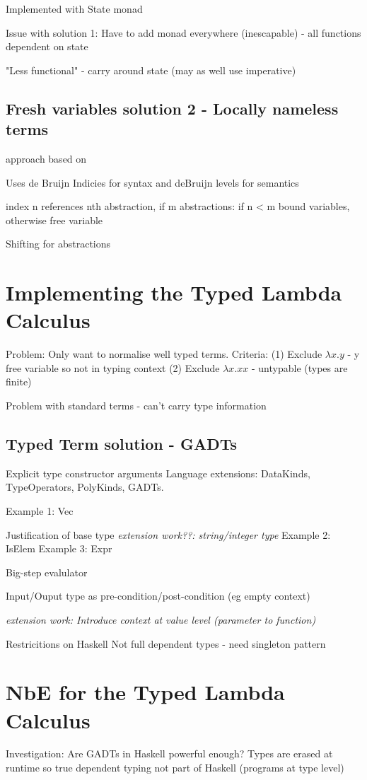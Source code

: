 \documentclass{article}
\begin{document}
Implemented with State monad

Issue with solution 1: Have to add monad everywhere (inescapable) - all functions dependent on state

"Less functional" - carry around state (may as well use imperative)

\subsection{Fresh variables solution 2 - Locally nameless terms}
approach based on \cite{deBruijn}

Uses de Bruijn Indicies for syntax and deBruijn levels for semantics

index n references nth abstraction,
if m abstractions: if n < m bound variables, otherwise free variable

Shifting for abstractions

\section{Implementing the Typed Lambda Calculus}
Problem: Only want to normalise well typed terms.
Criteria: 
(1) Exclude $\lambda x . y$ - y free variable so not in typing context
(2) Exclude $\lambda x.xx$ - untypable (types are finite)

Problem with standard terms - can't carry type information

\subsection{Typed Term solution - GADTs}
\cite{GADTs}
Explicit type constructor arguments
Language extensions:
DataKinds, TypeOperators, PolyKinds, GADTs.

Example 1: Vec 

Justification of base type \textit{extension work??: string/integer type}
Example 2: IsElem
Example 3: Expr

Big-step evalulator

Input/Ouput type as pre-condition/post-condition (eg empty context)

\textit{extension work: Introduce context at value level (parameter to function)} 

Restricitions on Haskell
Not full dependent types - need singleton pattern

\section{NbE for the Typed Lambda Calculus}
Investigation: Are GADTs in Haskell powerful enough? Types are erased at runtime so true dependent typing not part of Haskell (programs at type level)
\end{document}
